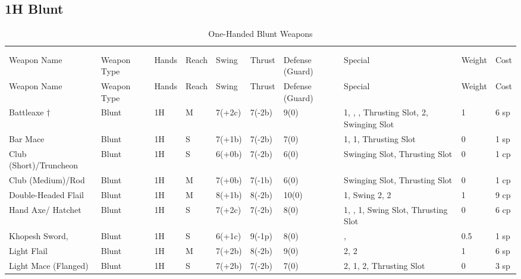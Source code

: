 \documentclass[oneside,11pt,english]{book}
\begin{document}
\subsection{1H Blunt}\vspace{-15pt}
\begin{longtabu} to 1\linewidth {X[2,l]XX[-1,c]X[-1,c]XXX[-1,c]X[2,l]X[-3,c]X[-3,r]}
	\captionsetup{labelformat=blank,textformat=empty}
	\caption{One-Handed Blunt Weapons}\vspace{-15pt}\\
	\label{tab:1H Blunt}\\
		Weapon Name						&Weapon Type	&Hands&Reach&Swing&Thrust&Defense (Guard)&Special						&Weight	&Cost\\\toprule\endfirsthead
Weapon Name						&Weapon Type	&Hands&Reach&Swing&Thrust&Defense (Guard)&Special						&Weight	&Cost\\\toprule\endhead
{Battleaxe \hyperref[wep:battleaxe-2h]{$ \dagger $}\label{wep:battleaxe-1h}} &Blunt &1H &M &7(+2c) &7(-2b) &9(0)&  1, , , Thrusting Slot,  2, Swinging Slot &1 &6 sp\\
Bar Mace &Blunt &1H &S &7(+1b) &7(-2b) &7(0)&  1,  1, Thrusting Slot &0 &1 sp\\
Club (Short)/Truncheon &Blunt &1H &S &6(+0b) &7(-2b) &6(0)& Swinging Slot, Thrusting Slot &0 &1 cp\\
Club (Medium)/Rod &Blunt &1H &M &7(+0b) &7(-1b) &6(0)& Swinging Slot, Thrusting Slot &0 &1 cp\\
Double-Headed Flail &Blunt &1H &M &8(+1b) &8(-2b) &10(0)&  1,  Swing 2,  2 &1 &9 cp\\
Hand Axe/ Hatchet &Blunt &1H &S &7(+2c) &7(-2b) &8(0)&  1, ,  1, Swing Slot, Thrusting Slot &0 &6 cp\\
Khopesh Sword, &Blunt &1H &S &6(+1c) &9(-1p) &8(0)& ,  &0.5 &1 sp\\
Light Flail &Blunt &1H &M &7(+2b) &8(-2b) &9(0)&  2,  2 &1 &6 sp\\
Light Mace (Flanged) &Blunt &1H &S &7(+2b) &7(-2b) &7(0)&  2,  1,  2, Thrusting Slot &0 &3 sp\\

\end{longtabu}
\end{document}
